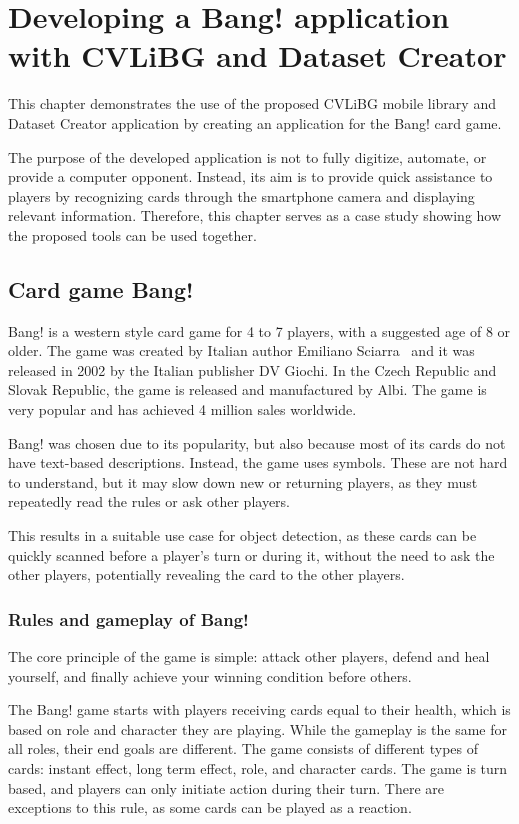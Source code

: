 
\chapter{Developing a Bang! application with CVLiBG and Dataset Creator}
\label{bangImplementation}
This chapter demonstrates the use of the proposed CVLiBG mobile library and Dataset Creator application by creating an application for the Bang! card game. 

The purpose of the developed application is not to fully digitize, automate, or provide a computer opponent. Instead, its aim is to provide quick assistance to players by recognizing cards through the smartphone camera and displaying relevant information. Therefore, this chapter serves as a case study showing how the proposed tools can be used together.

\section{Card game Bang!}
Bang! is a western style card game for 4 to 7 players, with a suggested age of 8 or older. The game was created by Italian author Emiliano Sciarra~\cite{bangWiki} and it was released in 2002 by the Italian publisher DV Giochi. In the Czech Republic and Slovak Republic, the game is released and manufactured by Albi. The game is very popular and has achieved 4 million sales worldwide.

Bang! was chosen due to its popularity, but also because most of its cards do not have text-based descriptions. Instead, the game uses symbols. These are not hard to understand,
but it may slow down new or returning players, as they must repeatedly read the rules or ask other players. 

This results in a suitable use case for object detection, as these cards can be quickly scanned before a player's turn or during it, without the need to ask the other players, potentially revealing the card to the other players.


\subsection{Rules and gameplay of Bang!}
The core principle of the game is simple: attack other players, defend and heal yourself, and finally achieve your winning condition before others. 

The Bang! game starts with players receiving cards equal to their health, which is based on role and character they are playing. While the gameplay is the same for all roles, their end goals are different. The game consists of different types of cards: instant effect, long term effect, role, and character cards. The game is turn based, and players can only initiate action during their turn. There are exceptions to this rule, as some cards can be played as a reaction. 

